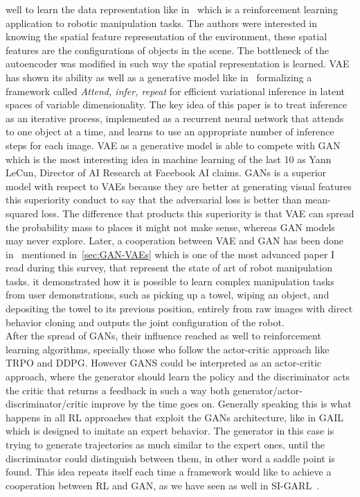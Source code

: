 well to learn the data representation like in~\cite{finn2016deep} which is a reinforcement learning application to robotic manipulation tasks. The authors were interested in knowing the spatial feature representation of the environment, these spatial features are the configurations of objects in the scene. The bottleneck of the autoencoder was modified in such way the spatial representation is learned. VAE has shown its ability as well as a generative model like in~\cite{eslami2016attend} formalizing a framework called \textit{Attend, infer, repeat} for efficient variational inference in latent spaces of variable dimensionality. The key idea of this paper is to treat inference as an iterative process, implemented as a recurrent neural network that attends to one object
at a time, and learns to use an appropriate number of inference steps for each image. VAE as a generative model is able to compete with GAN which is the most interesting idea in machine learning of the last 10 as Yann LeCun, Director of AI Research at Facebook AI claims. GANs is a superior model with respect to VAEs because they are better at generating visual features this superiority conduct to say that the adversarial loss is better than mean-squared loss. The difference that products this superiority is that VAE can spread the probability mass to places it might not make sense, whereas GAN models may never explore. Later, a cooperation between VAE and GAN has been done in~\cite{rahmatizadeh2018vision} mentioned in~\ref{sec:GAN-VAEs} which is one of the most advanced paper I read during this survey, that represent the state of art of robot manipulation tasks. it demonstrated how it is possible to learn complex manipulation tasks from user demonstrations, such as picking up a towel, wiping an object, and depositing the towel to its previous position, entirely from raw images with direct behavior cloning and outputs the joint configuration of the robot. \\
After the spread of GANs, their influence reached as well to reinforcement learning algorithms, specially those who follow the actor-critic approach like TRPO and DDPG. However GANS could be interpreted as an actor-critic approach, where the generator should learn the policy and the discriminator acts the critic that returns a feedback in such a way both generator/actor-discriminator/critic improve by the time goes on. Generally speaking this is what happens in all RL approaches that exploit the GANs architecture, like in GAIL~\cite{DBLP:journals/corr/HoE16} which is designed to imitate an expert behavior. The generator in this case is trying to generate trajectories as much similar to the expert ones, until the discriminator could distinguish between them, in other word a saddle point is found. This idea repeats itself each time a framework would like to achieve a cooperation between RL and GAN, as we have seen as well in SI-GARL~\cite{liu2019self}.


\clearpage{\pagestyle{empty}\cleardoublepage}